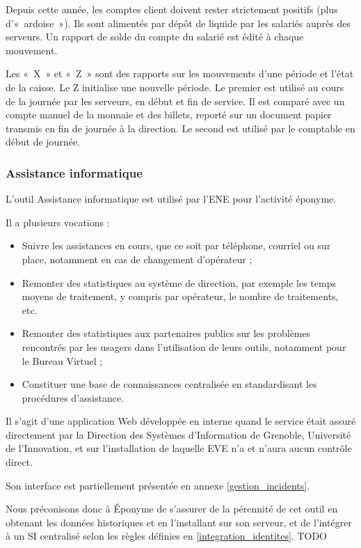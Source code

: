 Depuis cette année, les comptes client doivent rester strictement positifs
(plus d'«~ardoise~»).
Ils sont alimentés par dépôt de liquide par les salariés auprès des serveurs.
Un rapport de solde du compte du salarié est édité à chaque mouvement.

Les «~X~» et «~Z~» sont des rapports sur les mouvements d'une période et
l'état de la caisse. Le Z initialise une nouvelle période.
Le premier est utilisé au cours de la journée par les serveurs, en début et fin
de service. Il est comparé avec un compte manuel de la monnaie et des billets,
reporté sur un document papier transmis en fin de journée à la direction.
Le second est utilisé par le comptable en début de journée.

\subsubsection{Assistance informatique}

L'outil Assistance informatique est utilisé par l'ENE pour l'activité éponyme.

Il a plusieurs vocations :
\begin{itemize}
\item Suivre les assistances en cours, que ce soit par téléphone,
      courriel ou sur place, notamment en cas de changement d'opérateur ;
\item Remonter des statistiques au système de direction, par exemple les temps
      moyens de traitement, y compris par opérateur, le nombre de traitements,
      etc.
\item Remonter des statistiques aux partenaires publics sur les problèmes
      rencontrés par les usagers dans l'utilisation de leurs outils, notamment
      pour le Bureau Virtuel ;
\item Constituer une base de connaissances centralisée en standardisant les
      procédures d'assistance.
\end{itemize}

Il s'agit d'une application Web développée en interne quand le service était
assuré directement par la Direction des Systèmes d'Information de Grenoble,
Université de l'Innovation, et sur l'installation de laquelle EVE n'a et
n'aura aucun contrôle direct.

Son interface est partiellement présentée en annexe \ref{gestion_incidents}.

Nous préconisons donc à Éponyme de s'assurer de la pérennité de cet outil
en obtenant les données historiques et en l'installant sur son serveur,
et de l'intégrer à un SI centralisé selon les règles définies en
\ref{integration_identites}.
TODO \label{integration_identites}

